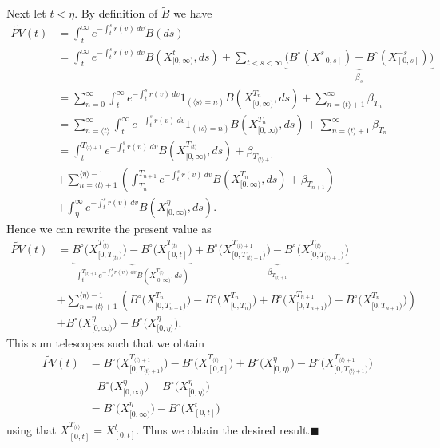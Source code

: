\documentclass[a4paper,10pt,openany]{book}
\begin{document}
Next let \(t<\eta\). By definition of \(\tilde B\) we have
\begin{align*}
\tilde{PV}(t)&=\int_t^\infty e^{-\int_t^s r(v)\ dv}\tilde B(ds)\\
&= \int_t^\infty e^{-\int_t^s r(v)\ dv}B(X^t_{[0,\infty)},ds)+\sum_{t< s<\infty}\underbrace{\Big(B^\circ(X^s_{[0,s]})-B^\circ(X^{-s}_{[0,s]})\Big)}_{\beta_s}\\
&=\sum_{n=0}^\infty\int_t^\infty e^{-\int_t^s r(v)\ dv}1_{(\langle s\rangle = n)}B(X^{T_n}_{[0,\infty)},ds)+\sum_{n=\langle t\rangle +1}^\infty\beta_{T_n}\\
&=\sum_{n=\langle t\rangle}^\infty\int_t^\infty e^{-\int_t^s r(v)\ dv}1_{(\langle s\rangle = n)}B(X^{T_n}_{[0,\infty)},ds)+\sum_{n=\langle t\rangle +1}^\infty\beta_{T_n}\\
&=\int_t^{T_{\langle t\rangle +1}}e^{-\int_t^s r(v)\ dv}B(X^{T_{\langle t\rangle}}_{[0,\infty)},ds)+\beta_{T_{\langle t\rangle +1}}\\
&+\sum_{n=\langle t\rangle +1}^{\langle \eta\rangle-1}\left(\int_{T_n}^{T_{n +1}}e^{-\int_t^s r(v)\ dv}B(X^{T_n}_{[0,\infty)},ds)+\beta_{T_{n +1}}\right)\\
&+\int_\eta^\infty e^{-\int_t^s r(v)\ dv}B(X^{\eta}_{[0,\infty)},ds).
\end{align*}
Hence we can rewrite the present value as
\begin{align*}
\tilde{PV}(t)&=\underbrace{B^\circ\Big(X^{T_{\langle t\rangle}}_{[0,T_{\langle t\rangle})}\Big)-B^\circ\Big(X^{T_{\langle t\rangle}}_{[0,t]}\Big)}_{\int_t^{T_{\langle t\rangle +1}}e^{-\int_t^s r(v)\ dv}B(X^{T_{\langle t\rangle}}_{[0,\infty)},ds)}+\underbrace{B^\circ\Big(X^{T_{\langle t\rangle+1}}_{[0,T_{\langle t\rangle+1})}\Big)-B^\circ\Big(X^{T_{\langle t\rangle}}_{[0,T_{\langle t\rangle + 1})}\Big)}_{\beta_{T_{\langle t\rangle +1}}}\\
&+\sum_{n=\langle t\rangle +1}^{\langle \eta\rangle-1}\left(B^\circ\Big(X^{T_{n}}_{[0,T_{n+1})}\Big)-B^\circ\Big(X^{T_{n}}_{[0,T_n)}\Big)+B^\circ\Big(X^{T_{n+1}}_{[0,T_{n+1})}\Big)-B^\circ\Big(X^{T_{n}}_{[0,T_{n+1})}\Big)\right)\\
&+B^\circ\Big(X^{\eta}_{[0,\infty)}\Big)-B^\circ\Big(X^{\eta}_{[0,\eta)}\Big).
\end{align*}
This sum telescopes such that we obtain
\begin{align*}
\tilde{PV}(t)&=B^\circ\Big(X^{T_{\langle t\rangle +1}}_{[0,T_{\langle t\rangle +1})}\Big)-B^\circ\Big(X^{T_{\langle t\rangle }}_{[0,t]}\Big)+B^\circ\Big(X^{\eta}_{[0,\eta)}\Big)-B^\circ\Big(X^{T_{\langle t\rangle +1}}_{[0,T_{\langle t\rangle +1})}\Big)\\
&+B^\circ\Big(X^{\eta}_{[0,\infty)}\Big)-B^\circ\Big(X^{\eta}_{[0,\eta)}\Big)\\
&=B^\circ\Big(X^{\eta}_{[0,\infty)}\Big)-B^\circ\Big(X^{t}_{[0,t]}\Big)
\end{align*}
using that \(X^{T_{\langle t\rangle }}_{[0,t]}=X^{t}_{[0,t]}\). Thus we obtain the desired result.\(\blacksquare\)
\end{document}
